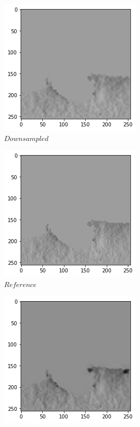 \documentclass[a4paper,12pt,twoside]{report}
\begin{document}
\begin{figure}
	\centering
	\begin{subfigure}{0.32\textwidth}
		\centering
		\includegraphics[scale=0.4]{superresolution/liquidvel_low.png}
		\caption{$Downsampled$}
	\end{subfigure}
	\begin{subfigure}{0.32\textwidth}
		\centering
		\includegraphics[scale=0.4]{superresolution/liquidvel_ref.png}
		\caption{$Reference$}
	\end{subfigure}
	\begin{subfigure}{0.32\textwidth}
		\centering
		\includegraphics[scale=0.4]{superresolution/liquidvel_mse.png}

\end{subfigure}
\end{figure}
\end{document}
